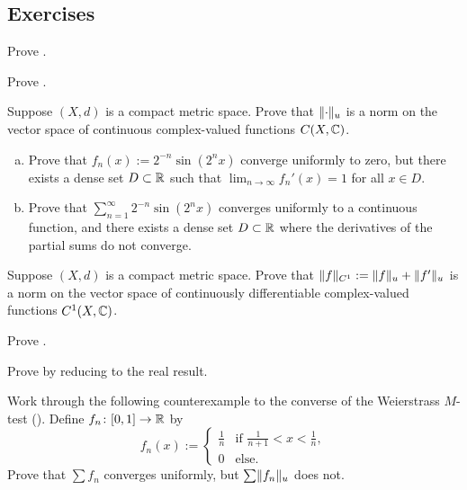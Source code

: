\subsection{Exercises}

\begin{exercise}
Prove .
\end{exercise}

\begin{exercise}
Prove .
\end{exercise}

\begin{exercise} \label{exercise:CXCnormedspace}
Suppose $(X,d)$ is a compact metric space.
Prove that $\lVert {\cdot} \rVert_u$ is a norm on the vector space of
continuous complex-valued functions $C(X,{\mathbb{C}})$.
\end{exercise}

\begin{exercise}
\leavevmode
\begin{enumerate}[a)]
\item
Prove that
$f_n(x) := 2^{-n} \sin(2^n x)$
converge uniformly to zero, but there exists a dense set $D \subset {\mathbb{R}}$
such that $\lim_{n\to\infty} f_n'(x) = 1$ for all $x \in D$.
\item
Prove that
$\sum_{n=1}^\infty 2^{-n} \sin(2^n x)$
converges uniformly to a continuous function,
and there exists a dense set $D \subset {\mathbb{R}}$
where the derivatives of the partial sums do not converge.
\end{enumerate}
\end{exercise}

\begin{exercise}
Suppose $(X,d)$ is a compact metric space.
Prove that $\lVert {f} \rVert_{C^1} := \lVert {f} \rVert_u+\lVert {f'} \rVert_u$
is a norm on the vector space of
continuously differentiable complex-valued functions $C^1(X,{\mathbb{C}})$.
\end{exercise}

\begin{exercise}
Prove .
\end{exercise}

\begin{exercise}
Prove  by reducing to the real
result.
\end{exercise}

\begin{exercise}
Work through the following counterexample to the converse of
the Weierstrass $M$-test ().  Define
$f_n \colon [0,1] \to {\mathbb{R}}$ by
\begin{equation*}
f_n(x) :=
\begin{cases}
\frac{1}{n} & \text{if } \frac{1}{n+1} < x < \frac{1}{n},\\
0	    & \text{else.}
\end{cases}
\end{equation*}
Prove that $\sum f_n$ converges uniformly, but $\sum \lVert {f_n} \rVert_u$
does not.
\end{exercise}

